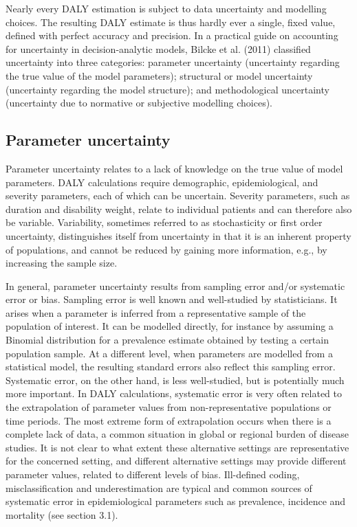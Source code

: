 \documentclass[]{book}
\begin{document}
Nearly every DALY estimation is subject to data uncertainty and
modelling choices. The resulting DALY estimate is thus hardly ever a
single, fixed value, defined with perfect accuracy and precision. In a
practical guide on accounting for uncertainty in decision-analytic
models, Bilcke et al. (2011) classified uncertainty into three
categories: parameter uncertainty (uncertainty regarding the true value
of the model parameters); structural or model uncertainty (uncertainty
regarding the model structure); and methodological uncertainty
(uncertainty due to normative or subjective modelling choices).

\subsection{Parameter uncertainty}\label{parameter-uncertainty}

Parameter uncertainty relates to a lack of knowledge on the true value
of model parameters. DALY calculations require demographic,
epidemiological, and severity parameters, each of which can be
uncertain. Severity parameters, such as duration and disability weight,
relate to individual patients and can therefore also be variable.
Variability, sometimes referred to as stochasticity or first order
uncertainty, distinguishes itself from uncertainty in that it is an
inherent property of populations, and cannot be reduced by gaining more
information, e.g., by increasing the sample size.

In general, parameter uncertainty results from sampling error and/or
systematic error or bias. Sampling error is well known and well-studied
by statisticians. It arises when a parameter is inferred from a
representative sample of the population of interest. It can be modelled
directly, for instance by assuming a Binomial distribution for a
prevalence estimate obtained by testing a certain population sample. At
a different level, when parameters are modelled from a statistical
model, the resulting standard errors also reflect this sampling error.
Systematic error, on the other hand, is less well-studied, but is
potentially much more important. In DALY calculations, systematic error
is very often related to the extrapolation of parameter values from
non-representative populations or time periods. The most extreme form of
extrapolation occurs when there is a complete lack of data, a common
situation in global or regional burden of disease studies. It is not
clear to what extent these alternative settings are representative for
the concerned setting, and different alternative settings may provide
different parameter values, related to different levels of bias.
Ill-defined coding, misclassification and underestimation are typical
and common sources of systematic error in epidemiological parameters
such as prevalence, incidence and mortality (see section 3.1).
\end{document}
